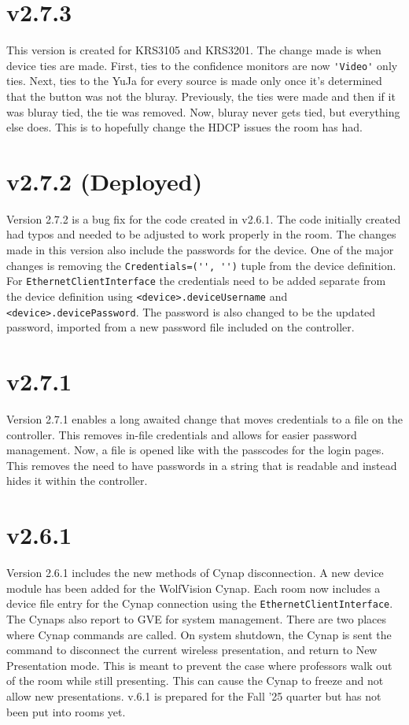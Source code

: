 \documentclass{article}
\begin{document}
\section*{v2.7.3}

This version is created for KRS3105 and KRS3201. The change made is when device ties are made. First, ties to the confidence 
monitors are now \lstinline|'Video'| only ties. Next, ties to the YuJa for every source is made only once it's determined that 
the button was not the bluray. Previously, the ties were made and then if it was bluray tied, the tie was removed. Now, bluray 
never gets tied, but everything else does. This is to hopefully change the HDCP issues the room has had. 

\section*{v2.7.2 (Deployed)}

Version 2.7.2 is a bug fix for the code created in v2.6.1. The code initially created had typos and needed to be adjusted to work 
properly in the room. The changes made in this version also include the passwords for the device. One of the major changes is 
removing the \lstinline|Credentials=('', '')| tuple from the device definition. For \lstinline|EthernetClientInterface| the 
credentials need to be added separate from the device definition using \lstinline|<device>.deviceUsername| and 
\lstinline|<device>.devicePassword|. The password is also changed to be the updated password, imported from a new password 
file included on the controller. 

\section*{v2.7.1}

Version 2.7.1 enables a long awaited change that moves credentials to a file on the controller. This removes in-file credentials 
and allows for easier password management. Now, a file is opened like with the passcodes for the login pages. This removes the need
to have passwords in a string that is readable and instead hides it within the controller. 

\section*{v2.6.1}

Version 2.6.1 includes the new methods of Cynap disconnection. A new device module has been added for the WolfVision Cynap. 
Each room now includes a device file entry for the Cynap connection using the \lstinline|EthernetClientInterface|. The Cynaps
also report to GVE for system management. There are two places where Cynap commands are called. On system shutdown, the 
Cynap is sent the command to disconnect the current wireless presentation, and return to New Presentation mode. This is meant
to prevent the case where professors walk out of the room while still presenting. This can cause the Cynap to freeze and not 
allow new presentations. v.6.1 is prepared for the Fall '25 quarter but has not been put into rooms yet. 
\end{document}
